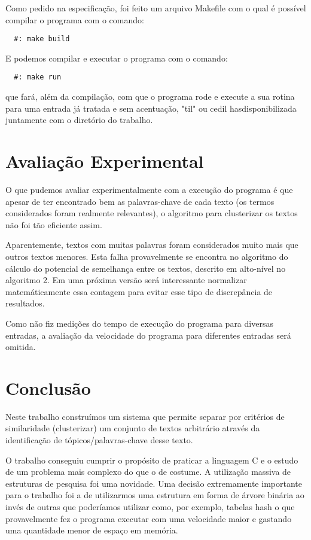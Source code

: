 \documentclass[12pt]{article}
\begin{document}
Como pedido na especificação, foi feito um arquivo Makefile com o qual é possível compilar
o programa com o comando: 
\begin{verbatim}
  #: make build
\end{verbatim}

E podemos compilar e executar o programa com o comando:
\begin{verbatim}
  #: make run
\end{verbatim}
que fará, além da compilação, com que o programa rode e execute a sua rotina para uma entrada
já tratada e sem acentuação, "til" ou cedil hasdisponibilizada juntamente com o diretório 
do trabalho.

\section{Avaliação Experimental}
\label{avaliacao_experimental}

O que pudemos avaliar experimentalmente com a execução do programa é que apesar de ter 
encontrado bem as palavras-chave de cada texto (os termos considerados foram realmente 
relevantes), o algoritmo para clusterizar os textos não foi tão eficiente assim.

Aparentemente, textos com muitas palavras foram considerados muito mais que outros textos 
menores. Esta falha provavelmente se encontra no algoritmo do cálculo do potencial de 
semelhança entre os textos, descrito em alto-nível no algoritmo 2. Em uma próxima versão 
será interessante normalizar matemáticamente essa contagem para evitar esse tipo de 
discrepância de resultados.

Como não fiz medições do tempo de execução do programa para diversas entradas, a avaliação
da velocidade do programa para diferentes entradas será omitida.

\section{Conclusão}
\label{conclusao}

Neste trabalho construímos um sistema que permite separar por critérios de similaridade
(clusterizar) um conjunto de textos arbitrário através da identificação de 
tópicos/palavras-chave desse texto.

O trabalho conseguiu cumprir o propósito de praticar a linguagem C e o estudo de um 
problema mais complexo do que o de costume. A utilização massiva de estruturas de pesquisa
foi uma novidade. Uma decisão extremamente importante para o trabalho foi a de utilizarmos 
uma estrutura em forma de árvore binária ao invés de outras que poderíamos utilizar como,
por exemplo, tabelas hash o que provavelmente fez o programa executar com uma velocidade 
maior e gastando uma quantidade menor de espaço em memória.
\end{document}
